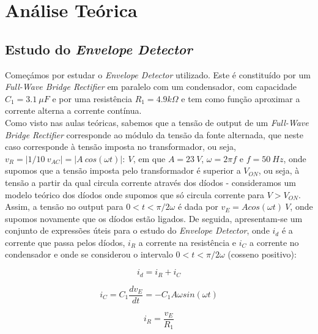\section{Análise Teórica}
\label{sec:analysis}


\subsection{Estudo do \emph{Envelope Detector}}

Começámos por estudar o \emph{Envelope Detector} utilizado. Este é constituído por um \emph{Full-Wave Bridge Rectifier}
em paralelo com um condensador, com capacidade $C_1 = 3.1 \: \mu F$ e por uma resistência $R_1 = 4.9 k \Omega$
e tem como função aproximar a corrente alterna a corrente contínua.
\\
Como visto nas aulas teóricas, sabemos que a tensão de output de um \emph{Full-Wave Bridge Rectifier} corresponde ao módulo da tensão
da fonte alternada, que neste caso corresponde à tensão imposta no transformador, ou seja,
$v_R = |1 / 10 \: v_{AC}| = |A\: cos(\omega t)| :\ V$, em que $A = 23 \: V$, $\omega = 2 \pi f$ e $f = 50 \: Hz$,
onde supomos que a tensão imposta pelo transformador é superior a $V_{ON}$, ou seja, à tensão a partir da qual circula corrente através dos díodos 
- consideramos um modelo teórico dos díodos onde supomos que só circula corrente para $V > V_{ON}$.
\\
Assim, a tensão no output para $0 < t < \pi / 2 \omega$ é dada por $v_E = A cos(\omega t) \:V$,
onde supomos novamente que os díodos estão ligados. De seguida, apresentam-se um conjunto de expressões úteis para o
estudo do \emph{Envelope Detector}, onde $i_d$ é a corrente que passa pelos díodos, $i_R$ a corrente na resistência
e $i_C$ a corrente no condensador e onde se considerou o intervalo $0 < t < \pi / 2 \omega$ (cosseno positivo):

\begin{equation}
    i_d = i_R + i_C
\end{equation}

\begin{equation}
    i_C = C_1 \frac{dv_E}{dt} = - C_1 A \omega sin(\omega t)
\end{equation}

\begin{equation}
    i_R = \frac{v_E}{R_1}
\end{equation}

